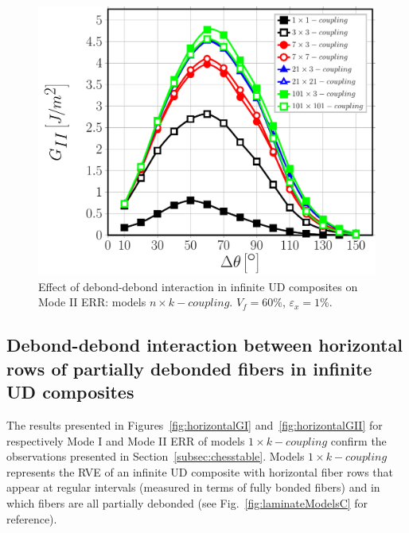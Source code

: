 \documentclass[review]{elsarticle}
\begin{document}
\begin{figure}[!h]
\centering
\includegraphics[width=\textwidth]{nxk-coupling-vf60-GII.pdf}
\caption{Effect of debond-debond interaction in infinite UD composites on Mode II ERR: models $n\times k-coupling$. $V_{f}=60\%$, $\varepsilon_{x}=1\%$.}\label{fig:debonddebondGII}
\end{figure}

\subsection{Debond-debond interaction between horizontal rows of partially debonded fibers in infinite UD composites}\label{subsec:horizontal}

The results presented in Figures~\ref{fig:horizontalGI} and~\ref{fig:horizontalGII} for respectively Mode I and Mode II ERR of models $1\times k-coupling$ confirm the observations presented in Section~\ref{subsec:chesstable}. Models $1\times k-coupling$ represents the RVE of an infinite UD composite with horizontal fiber rows that appear at regular intervals (measured in terms of fully bonded fibers) and in which fibers are all partially debonded (see Fig.~\ref{fig:laminateModelsC} for reference).
\end{document}

